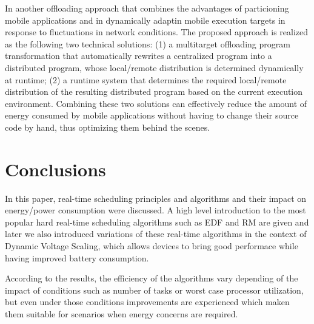 \documentclass[10pt,article]{IEEEtran}
\begin{document}
In \cite{kwon-tilevich} another offloading approach that combines the advantages of particioning mobile applications and in dynamically adaptin mobile execution targets in response to fluctuations in network conditions. The proposed approach is realized as the following two technical solutions: (1) a multitarget offloading program transformation that automatically rewrites a centralized program into a distributed program, whose local/remote distribution is determined dynamically at runtime; (2) a runtime system that determines the required local/remote distribution of the resulting distributed program based on the current execution environment. Combining these two solutions can effectively reduce the amount of energy consumed by mobile applications without having to change their source code by hand, thus optimizing them behind the scenes.


\section{Conclusions} \label{sec:conclusion}
In this paper, real-time scheduling principles and algorithms and their impact on energy/power consumption were discussed. A high level introduction to the most popular hard real-time scheduling algorithms such as EDF and RM are given and later we also introduced variations of these real-time algorithms in the context of Dynamic Voltage Scaling, which allows devices to bring good performace while having improved battery consumption.

According to the results, the efficiency of the algorithms vary depending of the impact of conditions such as number of tasks or worst case processor utilization, but even under those conditions improvements are experienced which maken them suitable for scenarios when energy concerns are required.

\IEEEdisplaynontitleabstractindextext


%
\IEEEpeerreviewmaketitle
\end{document}
